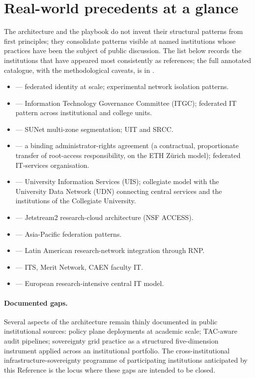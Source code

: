 \section{Real-world precedents at a glance}
\label{sec:synth-precedents}

The architecture and the playbook do not invent their structural
patterns from first principles; they consolidate patterns visible
at named institutions whose practices have been the subject of
public discussion. The list below records the institutions that
have appeared most consistently as references; the full annotated
catalogue, with the methodological caveats, is in
.

\begin{itemize}[leftmargin=1.5em,nosep]
  \item {} --- federated identity at scale; experimental network isolation patterns.
  \item {} --- Information Technology Governance Committee (ITGC); federated IT pattern across institutional and college units.
  \item {} --- SUNet multi-zone segmentation; UIT and SRCC.
  \item {} --- a binding administrator-rights agreement (a contractual, proportionate transfer of root-access responsibility, on the ETH Z\"urich model); federated IT-services organisation.
  \item {} --- University Information Services (UIS); collegiate model with the University Data Network (UDN) connecting central services and the institutions of the Collegiate University.
  \item {} --- Jetstream2 research-cloud architecture (NSF ACCESS).
  \item {} --- Asia-Pacific federation patterns.
  \item {} --- Latin American research-network integration through RNP.
  \item {} --- ITS, Merit Network, CAEN faculty IT.
  \item {} --- European research-intensive central IT model.
\end{itemize}

\paragraph{Documented gaps.} Several aspects of the architecture
remain thinly documented in public institutional sources: policy
plane deployments at academic scale; TAC-aware audit pipelines;
sovereignty grid practice as a structured five-dimension
instrument applied across an institutional portfolio. The
cross-institutional infrastructure-sovereignty programme of
participating institutions anticipated by this Reference is the
locus where these gaps are intended to be closed.

